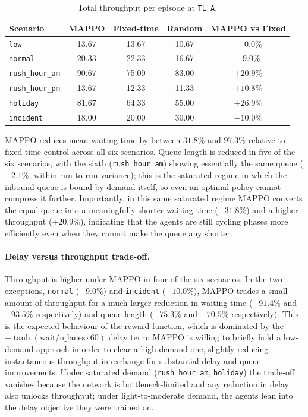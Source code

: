 ﻿\documentclass[11pt, a4paper]{report}
\begin{document}
\begin{table}[H]
\centering
\caption{Total throughput per episode at \texttt{TL\_A}.}
\label{tab:mappo_throughput}
\begin{tabular}{lcccc}
\toprule
\textbf{Scenario} & \textbf{MAPPO} & \textbf{Fixed-time} & \textbf{Random} & \textbf{MAPPO vs Fixed} \\
\midrule
\texttt{low}            & 13.67 & 13.67 & 10.67 & $\phantom{+}0.0\%$ \\
\texttt{normal}         & 20.33 & 22.33 & 16.67 & $-9.0\%$ \\
\texttt{rush\_hour\_am} & 90.67 & 75.00 & 83.00 & $+20.9\%$ \\
\texttt{rush\_hour\_pm} & 13.67 & 12.33 & 11.33 & $+10.8\%$ \\
\texttt{holiday}        & 81.67 & 64.33 & 55.00 & $+26.9\%$ \\
\texttt{incident}       & 18.00 & 20.00 & 30.00 & $-10.0\%$ \\
\bottomrule
\end{tabular}
\end{table}

MAPPO reduces mean waiting time by between $31.8\%$ and $97.3\%$ relative to fixed time control across all six scenarios. Queue length is reduced in five of the six scenarios, with the sixth (\texttt{rush\_hour\_am}) showing essentially the same queue ($+2.1\%$, within run-to-run variance); this is the saturated regime in which the inbound queue is bound by demand itself, so even an optimal policy cannot compress it further. Importantly, in this same saturated regime MAPPO converts the equal queue into a meaningfully shorter waiting time ($-31.8\%$) and a higher throughput ($+20.9\%$), indicating that the agents are still cycling phases more efficiently even when they cannot make the queue any shorter.

\paragraph{Delay versus throughput trade-off.}
Throughput is higher under MAPPO in four of the six scenarios. In the two exceptions, \texttt{normal} ($-9.0\%$) and \texttt{incident} ($-10.0\%$), MAPPO trades a small amount of throughput for a much larger reduction in waiting time ($-91.4\%$ and $-93.5\%$ respectively) and queue length ($-75.3\%$ and $-70.5\%$ respectively). This is the expected behaviour of the reward function, which is dominated by the $-\tanh(\text{wait}/\text{n\_lanes}\!\cdot\!60)$ delay term: MAPPO is willing to briefly hold a low-demand approach in order to clear a high demand one, slightly reducing instantaneous throughput in exchange for substantial delay and queue improvements. Under saturated demand (\texttt{rush\_hour\_am}, \texttt{holiday}) the trade-off vanishes because the network is bottleneck-limited and any reduction in delay also unlocks throughput; under light-to-moderate demand, the agents lean into the delay objective they were trained on.
\end{document}
